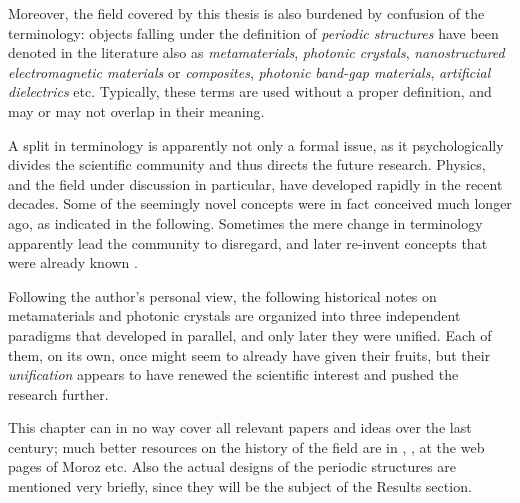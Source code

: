Moreover, the field covered by this thesis is also burdened by confusion of the terminology: objects falling under the definition of \textit{periodic structures} have been denoted in the literature also as \textit{metamaterials}, \textit{photonic crystals}, \textit{nanostructured electromagnetic materials} or \textit{composites}, \textit{photonic band-gap materials}, \textit{artificial dielectrics} etc. Typically, these terms are used without a proper definition, and may or may not overlap in their meaning. 

A split in terminology is apparently not only a formal issue, as it psychologically divides the scientific community and thus directs the future research.
Physics, and the field under discussion in particular, have developed rapidly in the recent decades. Some of the seemingly novel concepts were in fact conceived much longer ago, as indicated in the following. Sometimes the mere change in terminology apparently lead the community to disregard, and later re-invent concepts that were already known \cite[p. 5]{klingshirn2007semiconductor}. 


Following the author's personal view,
the following historical notes on metamaterials and photonic crystals are organized into three independent paradigms that developed in parallel, and only later they were unified. Each of them, on its own, once might seem to already have given their fruits, but their \textit{unification} appears to have renewed the scientific interest and pushed the research further. 

This chapter can in no way cover all relevant papers and ideas over the last century; much better resources on the history of the field are in \cite{shamonina2007metamaterials,eleftheriades2012transforming, paudyal2013left}, 
, at the web pages of Moroz \cite{moroz} etc. Also the actual designs of the periodic structures are mentioned very briefly, since they will be the subject of the Results section.


